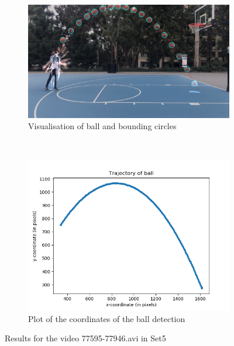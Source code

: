 \documentclass[12pt]{article}
\begin{document}
\begin{figure}[H]
    \centering
    \begin{subfigure}[b]{0.7\textwidth}
         \centering
         \includegraphics[width=\textwidth]{../results/visualisations/output_Set5_77595-77946.png}
         \caption{Visualisation of ball and bounding circles}
     \end{subfigure}\\
     \begin{subfigure}[b]{0.7\textwidth}
         \centering
         \includegraphics[width=\textwidth]{../results/plots/Set5_77595-77946.png}
         \caption{Plot of the coordinates of the ball detection}
     \end{subfigure}
     \caption{Results for the video 77595-77946.avi in Set5}
\end{figure}
\end{document}
